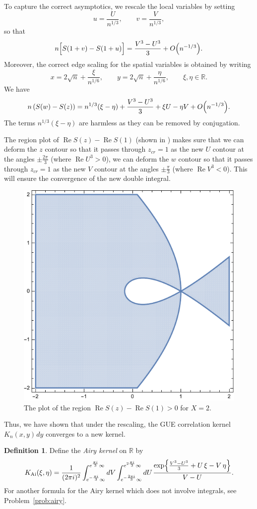\documentclass[letterpaper,11pt,oneside,reqno]{article}
\numberwithin{equation}{section}
\newcommand{\ssp}{\hspace{1pt}}
\theoremstyle{definition}
\newtheorem{definition}[proposition]{Definition}
\begin{document}
To capture the correct asymptotics, we rescale the local variables by setting
\[
u=\frac{U}{n^{1/3}},\qquad v=\frac{V}{n^{1/3}},
\]
so that
\[
n\Bigl[S(1+v)-S(1+u)\Bigr]=\frac{V^3-U^3}{3}+O\Bigl(n^{-1/3}\Bigr).
\]
Moreover, the correct edge scaling for the spatial variables is obtained by writing
\[
x=2\sqrt{n}+\frac{\xi}{n^{1/6}},\qquad y=2\sqrt{n}+\frac{\eta}{n^{1/6}},\qquad \xi,\eta\in\mathbb{R}.
\]
We have
\begin{equation*}
	n\left( S(w)-S(z) \right)=n^{1/3}(\xi-\eta)+
	\frac{V^3-U^3}{3}+\xi U-\eta V+O\Bigl(n^{-1/3}\Bigr).
\end{equation*}
The terms $n^{1/3}(\xi-\eta)$ are harmless as they can be removed
by conjugation.

The region plot of $\operatorname{Re}S(z)-\operatorname{Re}S(1)$
(shown in )
makes sure that we can deform the $z$ contour so that it passes through $z_{cr}=1$
as the new $U$ contour at the angles $\pm \frac{2\pi}{3}$ (where $\operatorname{Re}U^3>0$),
we can deform the $w$ contour so that it passes through $z_{cr}=1$
as the new $V$ contour at the angles $\pm \frac{\pi}{3}$ (where $\operatorname{Re}V^3<0$).
This will ensure the convergence of the new double integral.

\begin{figure}[htpb]
	\centering
	\includegraphics[height=.3\textwidth]{pictures/ReS_edge.pdf}
	\caption{The plot of the region $\operatorname{Re}S(z)-\operatorname{Re}S(1)>0$ for $X=2$.}
	\label{fig:ReS_edge}
\end{figure}

Thus, we have shown that under the rescaling, the GUE correlation kernel
$K_n(x,y)\ssp dy$ converges to a new kernel.
\begin{definition}
	\label{def:Airy_kernel}
	Define the \emph{Airy kernel} on $\mathbb{R}$ by
	\begin{equation*}
		K_{\mathrm{Ai}}(\xi,\eta)=\frac{1}{(2\pi i)^2}
		\int_{e^{-\frac{\pi i}{3}}\infty}^{e^{\frac{\pi i}{3}}\infty}dV
		\int_{e^{-\frac{2\pi i}{3}}\infty}^{e^{2\frac{\pi i}{3}}\infty}dU
		\ssp
		\frac{\exp\Bigl\{\frac{V^3-U^3}{3}+U\,\xi-V\,\eta\Bigr\}}{V-U}.
	\end{equation*}
	For another formula for the Airy kernel
	which does not involve integrals,
	see
	Problem~\ref{prob:airy}.
\end{definition}
\end{document}
